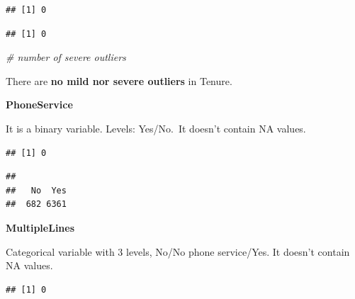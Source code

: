 \documentclass[
  twoside]{article}
\newenvironment{Shaded}{\begin{snugshade}}{\end{snugshade}}
\newcommand{\CommentTok}[1]{\textcolor[rgb]{0.56,0.35,0.01}{\textit{#1}}}
\newcommand{\DecValTok}[1]{\textcolor[rgb]{0.00,0.00,0.81}{#1}}
\newcommand{\FunctionTok}[1]{\textcolor[rgb]{0.13,0.29,0.53}{\textbf{#1}}}
\newcommand{\NormalTok}[1]{#1}
\newcommand{\OtherTok}[1]{\textcolor[rgb]{0.56,0.35,0.01}{#1}}
\newcommand{\SpecialCharTok}[1]{\textcolor[rgb]{0.81,0.36,0.00}{\textbf{#1}}}
\newcommand{\StringTok}[1]{\textcolor[rgb]{0.31,0.60,0.02}{#1}}
\begin{document}
\begin{verbatim}
## [1] 0
\end{verbatim}

\begin{Shaded}
\end{Shaded}

\begin{verbatim}
## [1] 0
\end{verbatim}

\begin{Shaded}
\begin{Highlighting}[]
\CommentTok{\# number of severe outliers}
\end{Highlighting}
\end{Shaded}

There are \textbf{no mild nor severe outliers} in Tenure.

\textbf{PhoneService}

It is a binary variable. Levels: Yes/No.~It doesn't contain NA values.

\begin{verbatim}
## [1] 0
\end{verbatim}

\begin{verbatim}
## 
##   No  Yes 
##  682 6361
\end{verbatim}

\textbf{MultipleLines}

Categorical variable with 3 levels, No/No phone service/Yes. It doesn't
contain NA values.

\begin{verbatim}
## [1] 0
\end{verbatim}
\end{document}
